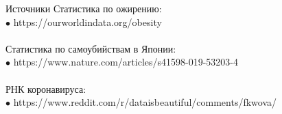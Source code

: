 \documentclass{beamer}
\begin{document}
\begin{frame}{Источники}
Статистика по ожирению:\\
$\bullet$   https://ourworldindata.org/obesity\\
\\
Статистика по самоубийствам в Японии:\\
$\bullet$   https://www.nature.com/articles/s41598-019-53203-4\\
\\
РНК коронавируса:\\
$\bullet$   https://www.reddit.com/r/dataisbeautiful/comments/fkwova/
\end{frame}
\end{document}
